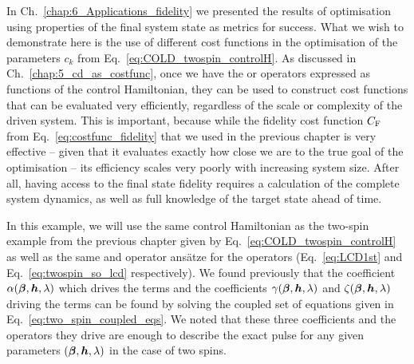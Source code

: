 In Ch.~\ref{chap:6_Applications_fidelity} we presented the results of optimisation using properties of the final system state as metrics for success. What we wish to demonstrate here is the use of different cost functions in the optimisation of the parameters $c_k$ from Eq.~\eqref{eq:COLD_twospin_controlH}. As discussed in Ch.~\ref{chap:5_cd_as_costfunc}, once we have the  or  operators expressed as functions of the control Hamiltonian, they can be used to construct cost functions that can be evaluated very efficiently, regardless of the scale or complexity of the driven system. This is important, because while the fidelity cost function $C_{\rm F}$ from Eq.~\eqref{eq:costfunc_fidelity} that we used in the previous chapter is very effective -- given that it evaluates exactly how close we are to the true goal of the optimisation -- its efficiency scales very poorly with increasing system size. After all, having access to the final state fidelity requires a calculation of the complete system dynamics, as well as full knowledge of the target state ahead of time. 

In this example, we will use the same control Hamiltonian as the two-spin example from the previous chapter given by Eq.~\eqref{eq:COLD_twospin_controlH} as well as the same  and  operator ans\"{a}tze for the  operators (Eq.~\eqref{eq:LCD1st} and Eq.~\eqref{eq:twospin_so_lcd} respectively). We found previously that the coefficient $\alpha(\boldsymbol{\beta}, \boldsymbol{h}, \lambda)$ which drives the   terms and the coefficients $\gamma(\boldsymbol{\beta}, \boldsymbol{h}, \lambda)$ and $\zeta(\boldsymbol{\beta}, \boldsymbol{h}, \lambda)$ driving the   terms can be found by solving the coupled set of equations given in Eq.~\eqref{eq:two_spin_coupled_eqs}. We noted that these three coefficients and the operators they drive are enough to describe the exact  pulse for any given parameters $(\boldsymbol{\beta}, \boldsymbol{h}, \lambda)$ in the case of two spins.

